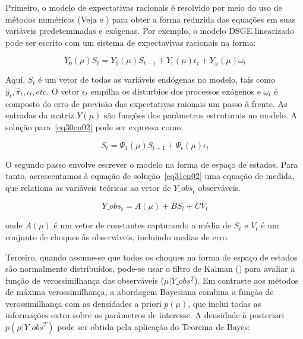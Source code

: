 \documentclass[twoside,a4paper,11pt]{report}
\begin{document}
{{Primeiro, o modelo de expectativas racionais é resolvido por meio do uso de métodos numéricos (Veja \citet{sims2002solving} e \citet{uhlig1998toolkit}) para obter a forma reduzida das equações em suas variáveis predeteminadas e exógenas. Por exemplo, o modelo DSGE linearizado pode ser escrito com um sistema de expectavivas racionais na forma:

\begin{equation}\label{eq30en02}
{Y}_{0}(\mu){S}_{t}={Y}_{1}(\mu){S}_{t-1}+{Y}_{\epsilon}(\mu){\epsilon_{t}}+{Y}_{\omega  }(\mu) {\omega}_{t}
\end{equation}

Aqui, ${S}_{t}$ é um vetor de todas as variáveis endógenas no modelo, tais como ${\hat{y}}_{t},{\hat{\pi}}_{t},{\hat{\iota}}_{t}, etc$. O vetor ${\epsilon_{t}}$ empilha os disturbios dos processos exógenos e ${\omega}_{t}$ é composto do erro de previsão das expectativas raionais um passo à frente. As entradas da matriz ${Y}(\mu)$ são funções dos parâmetros estruturais no modelo. A solução para~\ref{eq30en02} pode ser expressa como:

\begin{equation}\label{eq31en02}
{S}_{t}={\Psi}_{1}(\mu){S}_{t-1}+{\Psi}_{\epsilon}(\mu){\epsilon}_{t}
\end{equation}

O segundo passo envolve escrever o modelo na forma de espaço de estados. Para tanto, acrescentamos à equação de solução~\ref{eq31en02} uma equação de medida, que relationa as variáveis teóricas ao vetor de ${Y\_ obs}_{t}$ observáveis. 

\begin{equation}\label{eq32en02}
{Y\_ obs}_{t}=A(\mu)+B{S}_{t}+{CV}_{t}
\end{equation}

\noindent onde $A(\mu)$ é um vetor de constantes capturando a média de $S_{t}$ e $V_{t}$ é um conjunto de choques às observáveis, incluindo medias de erro. 

Terceiro, quando assume-se que todos os choques na forma de espaço de estados são normalmente distribuídos, pode-se usar o filtro de Kalman (\citet{sargent1989two}) para avaliar a função de verossimilhança das observáveis ($\mu|Y\_ obs^{T}$). Em contraste aos métodos de máxima verossimilhança, a abordagem Bayesiana combina a função de verossimilhança com as densidades a priori $p(\mu)$, que inclui todas as informações extra sobre os parâmetros de interesse. A densidade à posteriori $p(\mu |{Y\_ obs}^{T})$ pode ser obtida pela aplicação do Teorema de Bayes:

}}
\end{document}
